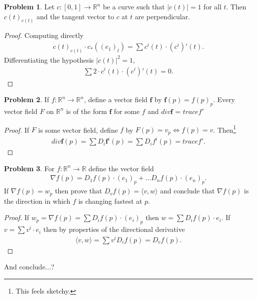 \documentclass[20pt]{article}
\theoremstyle{plain}
\theoremstyle{definition}
\newtheorem*{problem}{Problem}
\newcommand{\reals}{\mathbb{R}}
\begin{document}
\begin{problem}{4.16}
  Let $c: [0, 1] \to \reals^n$ be a curve such that $|c(t)| = 1$ for all $t$.
  Then $c(t)_{c(t)}$ and the tangent vector to $c$ at $t$ are perpendicular.
\end{problem}
\begin{proof}
  Computing directly
  \begin{align*}
    c(t)_{c(t)} \cdot c_*((e_1)_t) = \sum c^i(t) \cdot (c^i)'(t).
  \end{align*}
  Differentiating the hypothesis $|c(t)|^2 = 1$,
  \begin{align*}
    \sum 2 \cdot c^i(t) \cdot (c^i)'(t) = 0.
  \end{align*}
\end{proof}














\begin{problem}{4.17}
  If $f: \reals^n \to \reals^n$, define a vector  field $\pmb{f}$ by $\pmb{f}(p) = f(p)_p$.
  Every vector  field $F$ on $\reals^n$ is of the form $\pmb{f}$ for
  some $f$ and $div \pmb{f}$ = $trace f'$
\end{problem}

\begin{proof}
  If $F$ is some vector field, define $f$ by $F(p) = v_p \iff f(p) = v$.
  Then\footnote{This feels sketchy.} 
  \begin{align*}
    div\pmb{f}(p) = 
    \sum D_i\pmb{f}^i(p) = 
    \sum D_i f^i(p) = 
    trace f'.
  \end{align*}
\end{proof}







\begin{problem}{4.18}
  For $f: \reals^n \to \reals$ define the vector field 
  \begin{align*}
    \nabla f (p) = D_1f(p)\cdot (e_1)_p + ... D_nf(p)\cdot (e_n)_p.
  \end{align*}
  If $\nabla f(p) = w_p$ then prove that $D_vf(p) = \langle v, w \rangle$ and 
  conclude that $\nabla f (p)$ is the direction in which $f$ is changing fastest at $p$.
\end{problem}
\begin{proof}
  If $w_p = \nabla f (p) = \sum D_i f(p) \cdot (e_i)_p$ then $w = \sum D_i f(p) \cdot e_i.$
  If $v = \sum v^i \cdot e_i$ then by properties of the directional derivative
  \begin{align}
    \langle v, w \rangle = 
    \sum v^i D_if(p) = D_v f(p).
  \end{align}
\end{proof}
{\color{Blue} And conclude...?}
\end{document}

